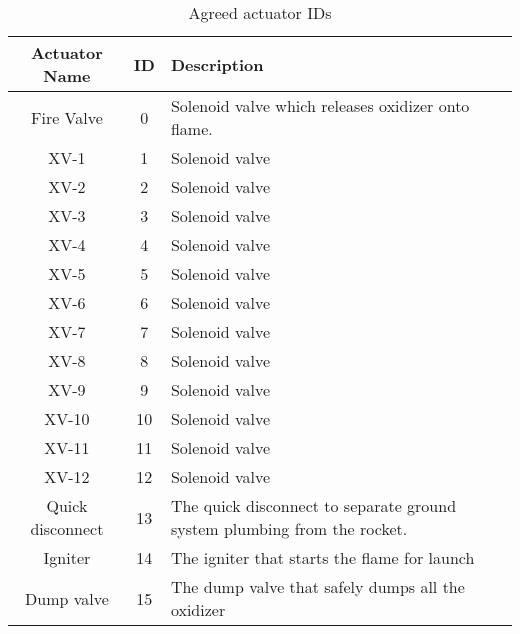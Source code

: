 \begin{table}
    \centering
    \begin{tabular}{| c | c | p{3in} |}
        \hline
        Actuator Name    & ID & Description                                                              \\
        \hline
        Fire Valve       & 0  & Solenoid valve which releases oxidizer onto flame.                       \\
        \hline
        XV-1             & 1  & Solenoid valve                                                           \\
        \hline
        XV-2             & 2  & Solenoid valve                                                           \\
        \hline
        XV-3             & 3  & Solenoid valve                                                           \\
        \hline
        XV-4             & 4  & Solenoid valve                                                           \\
        \hline
        XV-5             & 5  & Solenoid valve                                                           \\
        \hline
        XV-6             & 6  & Solenoid valve                                                           \\
        \hline
        XV-7             & 7  & Solenoid valve                                                           \\
        \hline
        XV-8             & 8  & Solenoid valve                                                           \\
        \hline
        XV-9             & 9  & Solenoid valve                                                           \\
        \hline
        XV-10            & 10 & Solenoid valve                                                           \\
        \hline
        XV-11            & 11 & Solenoid valve                                                           \\
        \hline
        XV-12            & 12 & Solenoid valve                                                           \\
        \hline
        Quick disconnect & 13 & The quick disconnect to separate ground system plumbing from the rocket. \\
        \hline
        Igniter          & 14 & The igniter that starts the flame for launch                             \\
        \hline
        Dump valve       & 15 & The dump valve that safely dumps all the oxidizer                        \\
        \hline
    \end{tabular}
    \caption{Agreed actuator IDs}
    \label{tbl:act-ids}
\end{table}


